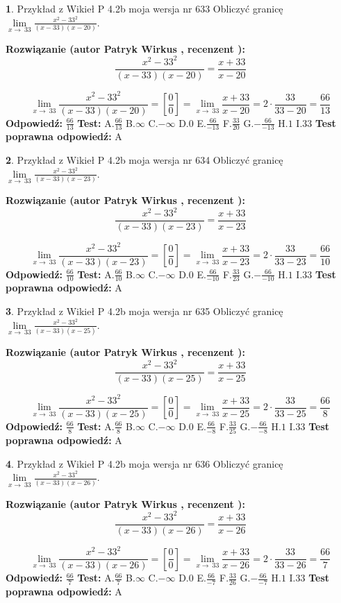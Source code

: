 \documentclass[12pt, a4paper]{article}
\theoremstyle{definition} %
\newtheorem{zad}{}
\newcommand{\zadStart}[1]{\begin{zad}#1\newline}
\newcommand{\zadStop}{\end{zad}}
\newcommand{\rozwStart}[2]{\noindent \textbf{Rozwiązanie (autor #1 , recenzent #2): }\newline}
\newcommand{\rozwStop}{\newline}
\newcommand{\odpStart}{\noindent \textbf{Odpowiedź:}\newline}
\newcommand{\odpStop}{\newline}
\newcommand{\testStart}{\noindent \textbf{Test:}\newline}
\newcommand{\testStop}{\newline}
\newcommand{\kluczStart}{\noindent \textbf{Test poprawna odpowiedź:}\newline}
\newcommand{\kluczStop}{\newline}
\begin{document}
\zadStart{Przykład z Wikieł P 4.2b moja wersja nr 633}
Obliczyć granicę $\lim\limits_{x\to\ 33}\frac{x^{2}-33^{2}}{(x-33)(x-20)}$.
\zadStop
\rozwStart{Patryk Wirkus}{}
$$\frac{x^{2}-33^{2}}{(x-33)(x-20)}=\frac{x+33}{x-20}$$

$$\lim\limits_{x\to\ 33}\frac{x^{2}-33^{2}}{(x-33)(x-20)}=[\frac{0}{0}]=\lim\limits_{x\to\ 33}\frac{x+33}{x-20}=2 \cdot \frac{33}{33-20} = \frac{66}{13}$$
\rozwStop
\odpStart
$\frac{66}{13}$
\odpStop
\testStart
A.$\frac{66}{13}$
B.$\infty$
C.$-\infty$
D.$0$
E.$\frac{66}{-13}$
F.$\frac{33}{20}$
G.$-\frac{66}{-13}$
H.$1$
I.$33$
\testStop
\kluczStart
A
\kluczStop



\zadStart{Przykład z Wikieł P 4.2b moja wersja nr 634}
Obliczyć granicę $\lim\limits_{x\to\ 33}\frac{x^{2}-33^{2}}{(x-33)(x-23)}$.
\zadStop
\rozwStart{Patryk Wirkus}{}
$$\frac{x^{2}-33^{2}}{(x-33)(x-23)}=\frac{x+33}{x-23}$$

$$\lim\limits_{x\to\ 33}\frac{x^{2}-33^{2}}{(x-33)(x-23)}=[\frac{0}{0}]=\lim\limits_{x\to\ 33}\frac{x+33}{x-23}=2 \cdot \frac{33}{33-23} = \frac{66}{10}$$
\rozwStop
\odpStart
$\frac{66}{10}$
\odpStop
\testStart
A.$\frac{66}{10}$
B.$\infty$
C.$-\infty$
D.$0$
E.$\frac{66}{-10}$
F.$\frac{33}{23}$
G.$-\frac{66}{-10}$
H.$1$
I.$33$
\testStop
\kluczStart
A
\kluczStop



\zadStart{Przykład z Wikieł P 4.2b moja wersja nr 635}
Obliczyć granicę $\lim\limits_{x\to\ 33}\frac{x^{2}-33^{2}}{(x-33)(x-25)}$.
\zadStop
\rozwStart{Patryk Wirkus}{}
$$\frac{x^{2}-33^{2}}{(x-33)(x-25)}=\frac{x+33}{x-25}$$

$$\lim\limits_{x\to\ 33}\frac{x^{2}-33^{2}}{(x-33)(x-25)}=[\frac{0}{0}]=\lim\limits_{x\to\ 33}\frac{x+33}{x-25}=2 \cdot \frac{33}{33-25} = \frac{66}{8}$$
\rozwStop
\odpStart
$\frac{66}{8}$
\odpStop
\testStart
A.$\frac{66}{8}$
B.$\infty$
C.$-\infty$
D.$0$
E.$\frac{66}{-8}$
F.$\frac{33}{25}$
G.$-\frac{66}{-8}$
H.$1$
I.$33$
\testStop
\kluczStart
A
\kluczStop



\zadStart{Przykład z Wikieł P 4.2b moja wersja nr 636}
Obliczyć granicę $\lim\limits_{x\to\ 33}\frac{x^{2}-33^{2}}{(x-33)(x-26)}$.
\zadStop
\rozwStart{Patryk Wirkus}{}
$$\frac{x^{2}-33^{2}}{(x-33)(x-26)}=\frac{x+33}{x-26}$$

$$\lim\limits_{x\to\ 33}\frac{x^{2}-33^{2}}{(x-33)(x-26)}=[\frac{0}{0}]=\lim\limits_{x\to\ 33}\frac{x+33}{x-26}=2 \cdot \frac{33}{33-26} = \frac{66}{7}$$
\rozwStop
\odpStart
$\frac{66}{7}$
\odpStop
\testStart
A.$\frac{66}{7}$
B.$\infty$
C.$-\infty$
D.$0$
E.$\frac{66}{-7}$
F.$\frac{33}{26}$
G.$-\frac{66}{-7}$
H.$1$
I.$33$
\testStop
\kluczStart
A
\kluczStop
\end{document}
